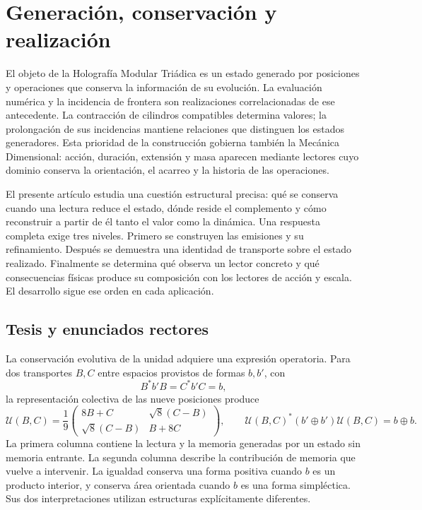 \section{Generación, conservación y realización}
\label{nuclear:introduccion}
El objeto de la Holografía Modular Triádica es un estado generado por posiciones y operaciones que conserva la información de su evolución. La evaluación numérica y la incidencia de frontera son realizaciones correlacionadas de ese antecedente. La contracción de cilindros compatibles determina valores; la prolongación de sus incidencias mantiene relaciones que distinguen los estados generadores. Esta prioridad de la construcción gobierna también la Mecánica Dimensional: acción, duración, extensión y masa aparecen mediante lectores cuyo dominio conserva la orientación, el acarreo y la historia de las operaciones.

El presente artículo estudia una cuestión estructural precisa: qué se conserva cuando una lectura reduce el estado, dónde reside el complemento y cómo reconstruir a partir de él tanto el valor como la dinámica. Una respuesta completa exige tres niveles. Primero se construyen las emisiones y su refinamiento. Después se demuestra una identidad de transporte sobre el estado realizado. Finalmente se determina qué observa un lector concreto y qué consecuencias físicas produce su composición con los lectores de acción y escala. El desarrollo sigue ese orden en cada aplicación.

\subsection{Tesis y enunciados rectores}
La conservación evolutiva de la unidad adquiere una expresión operatoria. Para dos transportes \(B,C\) entre espacios provistos de formas \(b,b'\), con
\[
B^{*}b'B=C^{*}b'C=b,
\]
la representación colectiva de las nueve posiciones produce
\begin{equation}
\mathcal U(B,C)=\frac19
\begin{pmatrix}8B+C&\sqrt8(C-B)\\ \sqrt8(C-B)&B+8C\end{pmatrix},
\qquad
\mathcal U(B,C)^*(b'\oplus b')\mathcal U(B,C)=b\oplus b.
\label{nuclear:eq:rectora}
\end{equation}
La primera columna contiene la lectura y la memoria generadas por un estado sin memoria entrante. La segunda columna describe la contribución de memoria que vuelve a intervenir. La igualdad conserva una forma positiva cuando \(b\) es un producto interior, y conserva área orientada cuando \(b\) es una forma simpléctica. Sus dos interpretaciones utilizan estructuras explícitamente diferentes.

